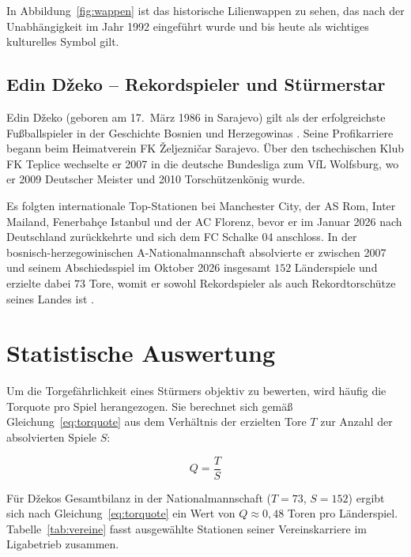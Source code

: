 \documentclass[a4paper, 12pt]{article}
\begin{document}
In Abbildung~\ref{fig:wappen} ist das historische Lilienwappen zu sehen, das nach der Unabhängigkeit im Jahr 1992 eingeführt wurde und bis heute als wichtiges kulturelles Symbol gilt.

\subsection{Edin D\v{z}eko -- Rekordspieler und Stürmerstar}
Edin D\v{z}eko (geboren am 17.~März 1986 in Sarajevo) gilt als der erfolgreichste Fußballspieler in der Geschichte Bosnien und Herzegowinas \parencite{wiki_dzeko}. Seine Profikarriere begann beim Heimatverein FK \v{Z}eljezni\v{c}ar Sarajevo. Über den tschechischen Klub FK Teplice wechselte er 2007 in die deutsche Bundesliga zum VfL Wolfsburg, wo er 2009 Deutscher Meister und 2010 Torschützenkönig wurde.

Es folgten internationale Top-Stationen bei Manchester City, der AS Rom, Inter Mailand, Fenerbah\c{c}e Istanbul und der AC Florenz, bevor er im Januar 2026 nach Deutschland zurückkehrte und sich dem FC Schalke 04 anschloss. In der bosnisch-herzegowinischen A-Nationalmannschaft absolvierte er zwischen 2007 und seinem Abschiedsspiel im Oktober 2026 insgesamt $152$ Länderspiele und erzielte dabei $73$ Tore, womit er sowohl Rekordspieler als auch Rekordtorschütze seines Landes ist \parencite{wiki_dzeko}.

\section{Statistische Auswertung}
Um die Torgefährlichkeit eines Stürmers objektiv zu bewerten, wird häufig die Torquote pro Spiel herangezogen. Sie berechnet sich gemäß Gleichung~\eqref{eq:torquote} aus dem Verhältnis der erzielten Tore $T$ zur Anzahl der absolvierten Spiele $S$:

\begin{equation}
    Q = \frac{T}{S}
    \label{eq:torquote}
\end{equation}

Für D\v{z}ekos Gesamtbilanz in der Nationalmannschaft ($T = 73$, $S = 152$) ergibt sich nach Gleichung~\eqref{eq:torquote} ein Wert von $Q \approx 0,48$ Toren pro Länderspiel. Tabelle~\ref{tab:vereine} fasst ausgewählte Stationen seiner Vereinskarriere im Ligabetrieb zusammen.
\end{document}
